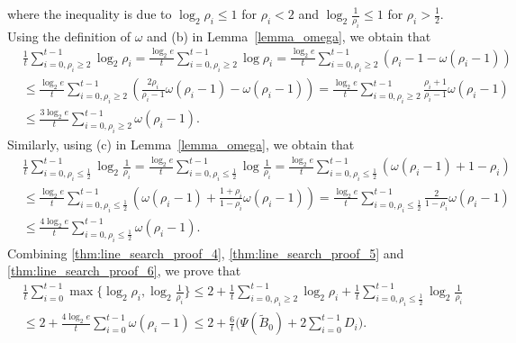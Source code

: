 \documentclass[11pt,letterpaper]{article}
\newcommand\0{{\Vector{0}}}
\newcommand\1{{\Vector{1}}}
\numberwithin{assumption}{section}
\numberwithin{definition}{section}
\numberwithin{theorem}{section}
\numberwithin{remark}{section}
\begin{document}
    where the inequality is due to $\log_{2}\rho_i \leq 1$ for $\rho_i < 2$ and $\log_{2}\frac{1}{\rho_i} \leq 1$ for $\rho_i > \frac{1}{2}$. Using the definition of $\omega$ and (b) in Lemma~\ref{lemma_omega}, we obtain that
    \begin{equation}\label{thm:line_search_proof_5}
    \begin{split}
        & \frac{1}{t}\sum_{i = 0, \rho_i \geq 2}^{t - 1}\log_{2}\rho_i = \frac{\log_{2}e}{t}\sum_{i = 0, \rho_i \geq 2}^{t - 1}\log\rho_i = \frac{\log_{2}e}{t}\sum_{i = 0, \rho_i \geq 2}^{t - 1}(\rho_i - 1 - \omega(\rho_i - 1)) \\
        & \leq \frac{\log_{2}e}{t}\sum_{i = 0, \rho_i \geq 2}^{t - 1}(\frac{2\rho_i}{\rho_i - 1}\omega(\rho_i - 1) - \omega(\rho_i - 1)) = \frac{\log_{2}e}{t}\sum_{i = 0, \rho_i \geq 2}^{t - 1}\frac{\rho_i + 1}{\rho_i - 1}\omega(\rho_i - 1) \\
        & \leq \frac{3\log_{2}e}{t}\sum_{i = 0, \rho_i \geq 2}^{t - 1}\omega(\rho_i - 1).
    \end{split}
    \end{equation}
    Similarly, using (c) in Lemma~\ref{lemma_omega}, we obtain that
    \begin{equation}\label{thm:line_search_proof_6}
    \begin{split}
        & \frac{1}{t}\sum_{i = 0, \rho_i \leq \frac{1}{2}}^{t - 1}\log_{2}\frac{1}{\rho_i} = \frac{\log_{2}e}{t}\sum_{i = 0, \rho_i \leq \frac{1}{2}}^{t - 1}\log\frac{1}{\rho_i} = \frac{\log_{2}e}{t}\sum_{i = 0, \rho_i \leq \frac{1}{2}}^{t - 1}(\omega(\rho_i - 1) + 1 - \rho_i) \\
        & \leq \frac{\log_{2}e}{t}\sum_{i = 0, \rho_i \leq \frac{1}{2}}^{t - 1}(\omega(\rho_i - 1) + \frac{1+ \rho_i}{1 - \rho_i}\omega(\rho_i - 1)) = \frac{\log_{2}e}{t}\sum_{i = 0, \rho_i \leq \frac{1}{2}}^{t - 1}\frac{2}{1 - \rho_i}\omega(\rho_i - 1) \\
        & \leq \frac{4\log_{2}e}{t}\sum_{i = 0, \rho_i \leq \frac{1}{2}}^{t - 1}\omega(\rho_i - 1).
    \end{split}
    \end{equation}
    Combining \eqref{thm:line_search_proof_4}, \eqref{thm:line_search_proof_5} and \eqref{thm:line_search_proof_6}, we prove that
    \begin{equation}\label{thm:line_search_proof_7}
    \begin{split}
        & \frac{1}{t}\sum_{i = 0}^{t - 1}\max\{\log_{2}\rho_i, \log_{2}\frac{1}{\rho_i}\} \leq 2 + \frac{1}{t}\sum_{i = 0, \rho_i \geq 2}^{t - 1}\log_{2}\rho_i + \frac{1}{t}\sum_{i = 0, \rho_i \leq \frac{1}{2}}^{t - 1}\log_{2}\frac{1}{\rho_i} \\
        & \leq 2 + \frac{4\log_{2}e}{t}\sum_{i = 0}^{t - 1}\omega(\rho_i - 1) \leq 2 + \frac{6}{t}\Big(\Psi(\tilde{B}_{0}) + 2\sum_{i = 0}^{t - 1}D_i\Big) .
    \end{split}
    \end{equation}
\end{document}
